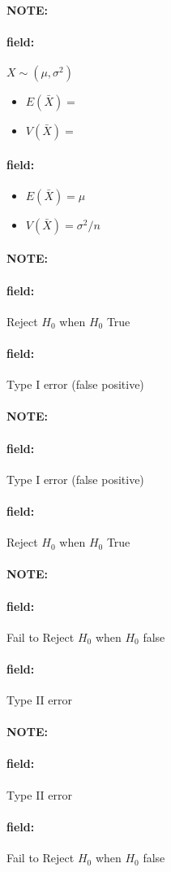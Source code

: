 \documentclass[12pt]{article}
\newenvironment{note}{\paragraph{NOTE:}}{}
\newenvironment{field}{\paragraph{field:}}{}
\begin{document}
\begin{note}
    \begin{field}
        $X \sim (\mu,\sigma^2)$
            \begin{itemize}
              \item $E(\bar{X}) = $
              \item $V(\bar{X}) = $
            \end{itemize}
    \end{field}
    \begin{field}
        \begin{itemize}
              \item $E(\bar{X}) = \mu$
              \item $V(\bar{X}) = \sigma^2/n$
            \end{itemize}
    \end{field}
\end{note}

\begin{note}
    \begin{field}
        Reject $H_0$ when $H_0$ True
    \end{field}
    \begin{field}
        Type I error (false positive)
    \end{field}
\end{note}

\begin{note}
    \begin{field}
        Type I error (false positive)
    \end{field}
    \begin{field}
        Reject $H_0$ when $H_0$ True
    \end{field}
\end{note}

\begin{note}
    \begin{field}
        Fail to Reject $H_0$ when $H_0$ false
    \end{field}
    \begin{field}
        Type II error
    \end{field}
\end{note}

\begin{note}
    \begin{field}
        Type II error
    \end{field}
    \begin{field}
        Fail to Reject $H_0$ when $H_0$ false
    \end{field}
\end{note}
\end{document}

